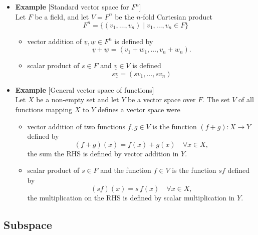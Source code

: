 \documentclass[11pt,twoside]{report}
\newcommand{\vecnot}{\underline}
\begin{document}
\begin{itemize}
\item \textbf{Example} [Standard vector space for $F^n$] \\
Let $F$ be a field, and let $V=F^n$ be the $n$-fold Cartesian product%
\[
F^n = \{ (v_1, \ldots, v_n) \mid v_1, \dots, v_n \in F\}
\]
\begin{itemize}
\item  vector addition  of $\vecnot{v}, \vecnot{w} \in F^n$  is defined by
\begin{equation*}
\vecnot{v} + \vecnot{w} = (v_1 + w_1, \ldots, v_n + w_n).
\end{equation*}
\item  scalar product of $s \in F$ and $\vecnot{v} \in V$ is defined 
\[s \vecnot{v} = (s v_1, \ldots, s v_n)\]
\end{itemize} 


\item \textbf{Example}  [General vector space of functions]\\
Let $X$ be a non-empty set and  let $Y$ be a vector space over $F$. The set $V$ of all functions mapping $X$ to $Y$ defines a vector space were
\begin{itemize}
\item vector addition of two functions $f,g \in V$ is the function $(f+g)\colon X \to Y$ defined by 
\begin{equation*}
(f + g)(x) = f(x) + g(x) \quad \forall x \in X,
\end{equation*}
the sum the RHS is defined by vector addition in $Y$.
\item scalar product of $s \in F$ and the function $f \in V$ is the function $sf$ defined by
\[
(sf)(x) = s \, f(x)\quad \forall x \in X,
\]
the multiplication  on the RHS is defined by scalar multiplication in $Y$.
\end{itemize}


\end{itemize}

\subsection{Subspace}
\end{document}
